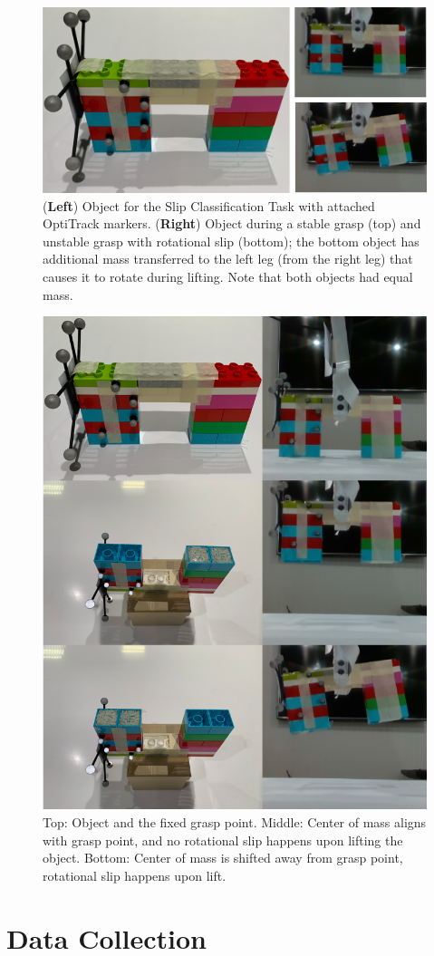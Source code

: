 \documentclass[fyp]{socreport}
\begin{document}
\begin{figure}
\centering
\includegraphics[width=0.65\columnwidth]{images/robotsetup/objects_exp2_small.png}
\caption{(\textbf{Left}) Object for the Slip Classification Task with attached
  OptiTrack markers. (\textbf{Right}) Object during a stable grasp (top) and
  unstable grasp with rotational slip (bottom); the bottom object has additional
  mass transferred to the left leg (from the right leg) that causes it to rotate
  during lifting. Note that both objects had equal
  mass.\label{img:slips}}
\end{figure}

\begin{figure}
  \centering
  \includegraphics[width=0.55\columnwidth]{images/robotsetup/slip_graf.png}
  \caption{Top: Object and the fixed grasp point. Middle: Center of mass aligns
    with grasp point, and no rotational slip happens upon lifting the object.
    Bottom: Center of mass is shifted away from grasp point, rotational slip
    happens upon lift.\label{img:slips}}
\end{figure}

\section{Data Collection}
\end{document}
